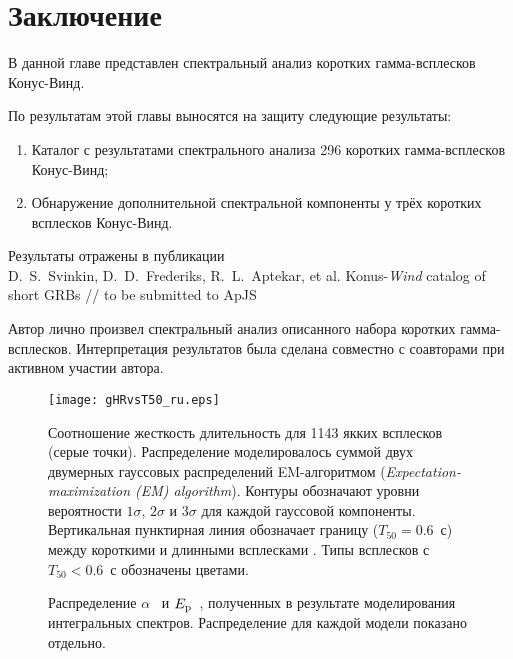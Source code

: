 \section{Заключение}
В данной главе представлен спектральный анализ коротких гамма-всплесков Конус-Винд.

По результатам этой главы выносятся на защиту следующие результаты:
\begin{enumerate}
\item Каталог с результатами спектрального анализа 296 коротких гамма-всплесков Конус-Винд;
\item Обнаружение дополнительной спектральной компоненты у трёх коротких всплесков Конус-Винд.
\end{enumerate}

Результаты отражены в публикации \\
D.~S.~Svinkin, D.~D.~Frederiks, R.~L.~Aptekar, et al. Konus-\textit{Wind} catalog of short GRBs //
to be submitted to ApJS

Автор лично произвел спектральный анализ описанного набора коротких гамма-всплесков.
Интерпретация результатов была сделана совместно с соавторами при активном участии автора.


\begin{figure}
    \begin{center}
        \texttt{[image: gHRvsT50\_ru.eps]}
    \end{center}
    \caption{
    Соотношение жесткость длительность для 1143 якких всплесков \kws (серые точки).
    Распределение моделировалось суммой двух двумерных гауссовых распределений
    EM-алгоритмом (\textit{Expectation-maximization (EM) algorithm}). 
    Контуры обозначают уровни вероятности $1\sigma$, $2\sigma$ и $3\sigma$ для каждой
    гауссовой компоненты. Вертикальная пунктирная линия обозначает границу ($T_{50}=0.6$~с)
    между короткими и длинными всплесками \kws. Типы всплесков с $T_{50}<0.6$~с 
    обозначены цветами.
    \label{fig:HRvsT50}}
\end{figure}

\begin{figure}
	\begin{center}
	\end{center}
    \caption{
    Распределение $\alpha$~ и $E_{\mathrm{p}}$~, полученных 
    в результате моделирования интегральных спектров. Распределение для каждой модели
    показано отдельно.
    \label{fig:par_dist} }
\end{figure}


